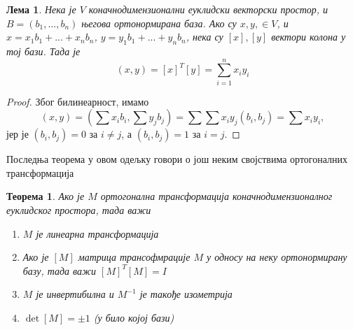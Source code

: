 \documentclass{report}
\theoremstyle{plain}
\newtheorem{thm}{Теорема}
\newtheorem*{lem}{Лема}
\theoremstyle{definition}
\begin{document}
\begin{lem}
  Нека је $V$ коначнодимензионални еуклидски векторски простор, и $B = (b_1, ..., b_n)$ његова ортонормирана база. Ако су $x, y, \in V$, и $x = x_1b_1+...+x_nb_n$, $y = y_1b_1+...+y_nb_n$, нека су $[x], [y]$ вектори колона у тој бази. Тада је $$(x, y) = [x]^T [y] = \sum_{i=1}^{n} x_iy_i$$
\end{lem}
\begin{proof}
    Због билинеарност, имамо
    $$(x, y) = (\sum x_ib_i, \sum y_j b_j) = \sum \sum x_iy_j(b_i, b_j) = \sum x_iy_i, $$
    јер је $(b_i, b_j) = 0$ за $i\neq j$, а $(b_i, b_j) = 1$ за $i=j$.
\end{proof}

Последња теорема у овом одељку говори о још неким својствима ортогоналних трансформација
\begin{thm}
Ако је $M$ ортогонална трансформација коначнодимензионалног еуклидског простора, тада важи
\begin{enumerate}
  \item $M$ је линеарна трансформација
  \item Ако је $[M]$ матрица трансофмрације $M$ у односу на неку ортонормирану базу, тада важи $[M]^T[M] = I$
  \item $M$ је инвертибилна и $M^{-1}$ је такође изометрија
  \item $\det [M]=\pm 1$ (у било којој бази)
\end{enumerate}
\end{thm}
\end{document}
